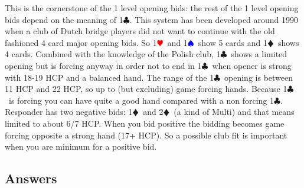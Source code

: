 \documentclass[a4paper]{article}
\newcommand{\BC}{\textcolor{OliveGreen}{$\clubsuit$}}
\newcommand{\BD}{\textcolor{RedOrange}{$\vardiamondsuit$}}
\newcommand{\BH}{\textcolor{Red}{$\varheartsuit${}}}
\newcommand{\BS}{\textcolor{Blue}{$\spadesuit${}}}
\begin{document}
This is the cornerstone of the 1 level opening bids: the rest of the 1 level
opening bids depend on the meaning of 1\BC . This system has been developed
around 1990 when a club of Dutch bridge players did not want to continue with
the old fashioned 4 card major opening bids.
\bigbreak
So 1\BH\ and 1\BS\ show 5 cards and 1\BD\ shows 4 cards. Combined with
the knowledge of the Polish club, 1\BC\ shows a limited opening but is forcing
anyway in order not to end in 1\BC\ when opener is strong with 18-19 HCP and a
balanced hand.
\bigbreak
The range of the 1\BC\ opening is between 11 HCP and 22 HCP, so up to (but
excluding) game forcing hands. Because 1\BC\ is forcing you can have quite a
good hand compared with a non forcing 1\BC .
\bigbreak
Responder has two negative bids: 1\BD\ and 2\BD\ (a kind of Multi) and that means
limited to about 6/7 HCP. When you bid positive the bidding becomes game
forcing opposite a strong hand (17+ HCP). So a possible club fit is important
when you are minimum for a positive bid.
\bigbreak
\subsection{Answers}
\end{document}
